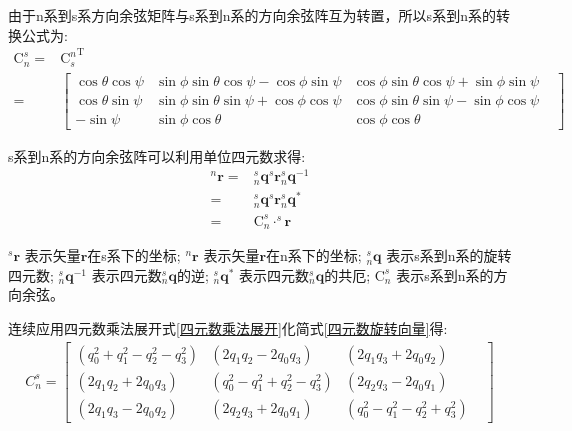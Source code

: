 由于n系到s系方向余弦矩阵与s系到n系的方向余弦阵互为转置\citep{方向余弦阵}，所以s系到n系的转换公式为:
\begin{equation}\label{欧拉角s转n}
    \begin{split} 
        \mathrm{C}^s_n=&{\mathrm{C}^n_s}^\mathrm{T} \\
             =&\left[\begin{matrix}
                \cos{\theta}\cos{\psi} & \sin{\phi}\sin{\theta}\cos{\psi}-\cos{\phi}\sin{\psi} & \cos{\phi}\sin{\theta}\cos{\psi}+\sin{\phi}\sin{\psi} & \\
                \cos{\theta}\sin{\psi} & \sin{\phi}\sin{\theta}\sin{\psi}+\cos{\phi}\cos{\psi} & \cos{\phi}\sin{\theta}\sin{\psi}-\sin{\phi}\cos{\psi} & \\
                -\sin{\psi} & \sin{\phi}\cos{\theta} & \cos{\phi}\cos{\theta} &
                \end{matrix}\right]
    \end{split}
\end{equation} 

s系到n系的方向余弦阵可以利用单位四元数\citep{四元数矢量旋转证明1,四元数矢量旋转证明2}求得:
\begin{equation}\label{四元数旋转向量}
    \begin{split} 
        ^n\bm{r} 
        = &^s_n\bm{q} ^s\bm{r} ^s_n\bm{q}^{-1} \\
        = &^s_n\bm{q} ^s\bm{r} ^s_n\bm{q}^{*} \\
        = &\mathrm{C}^s_n \cdot ^s\bm{r}
    \end{split}
\end{equation} 

$^s\bm{r}$          表示矢量$\bm{r}$在s系下的坐标;
$^n\bm{r}$          表示矢量$\bm{r}$在n系下的坐标;
$^s_n\bm{q}$        表示s系到n系的旋转四元数;
$^s_n\bm{q}^{-1}$   表示四元数$^s_n\bm{q}$的逆\citep{四元数矢量旋转证明1,四元数矢量旋转证明2};
$^s_n\bm{q}^{*}$    表示四元数$^s_n\bm{q}$的共厄\citep{四元数矢量旋转证明1,四元数矢量旋转证明2};
$\mathrm{C}^s_n$    表示s系到n系的方向余弦。

连续应用四元数乘法展开式\ref{四元数乘法展开}化简式\ref{四元数旋转向量}得:
\begin{equation}\label{四元数方向余弦阵}
    \begin{split} 
        C^s_n = \left[\begin{matrix} 
                (q^2_0+q^2_1-q^2_2-q^2_3) & (2q_1q_2-2q_0q_3) & (2q_1q_3+2q_0q_2) & \\
                (2q_1q_2+2q_0q_3) & (q^2_0-q^2_1+q^2_2-q^2_3) & (2q_2q_3-2q_0q_1) & \\
                (2q_1q_3-2q_0q_2) & (2q_2q_3+2q_0q_1) & (q^2_0-q^2_1-q^2_2+q^2_3) &
        \end{matrix}\right]
    \end{split}
\end{equation} 

